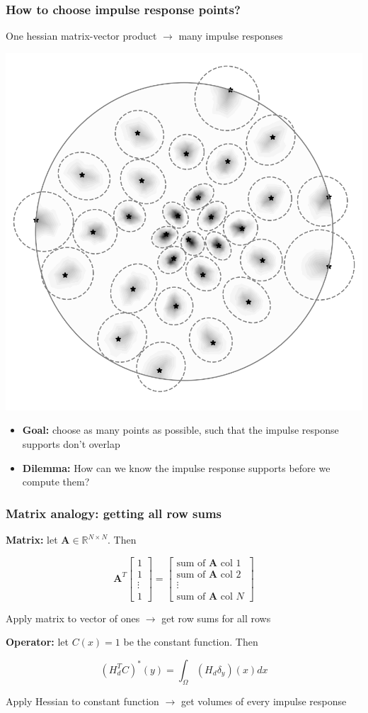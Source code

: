 \documentclass[10pt,final,xcolor=dvipsnames]{beamer}
\begin{document}
\begin{frame}
	\frametitle{How to choose impulse response points?}
	One hessian matrix-vector product $\rightarrow$ many impulse responses
	\begin{center}
		\includegraphics[width=0.5\columnwidth]{impulse_batch2.png} 
	\end{center}
	\begin{itemize}
		\item \textbf{Goal:} choose as many points as possible, such that the impulse response supports don't overlap
		\item \textbf{Dilemma:} How can we know the impulse response supports before we compute them?
	\end{itemize}
\end{frame}
\begin{frame}
	\frametitle{Matrix analogy: getting all row sums}
	
	\textbf{Matrix:} let $\mathbf{A} \in \mathbb{R}^{N \times N}$. Then
	
	$$\mathbf{A}^T \begin{bmatrix}
	1 \\ 1 \\ \vdots \\ 1
	\end{bmatrix} = \begin{bmatrix}
	\text{sum of }\mathbf{A} \text{ col }1 \\
	\text{sum of }\mathbf{A} \text{ col }2 \\
	\vdots \\
	\text{sum of }\mathbf{A} \text{ col }N
	\end{bmatrix}$$
	
	Apply matrix to vector of ones $\rightarrow$ get row sums for all rows
	
	\vspace{3em}
	
	\textbf{Operator:} let $C(x)=1$ be the constant function. Then 
	
	$$(H_d^T C)^*(y) = \int_\Omega \left(H_d \delta_y\right)(x) dx$$
	
	
	Apply Hessian to constant function $\rightarrow$ get volumes of every impulse response
\end{frame}
\end{document}
